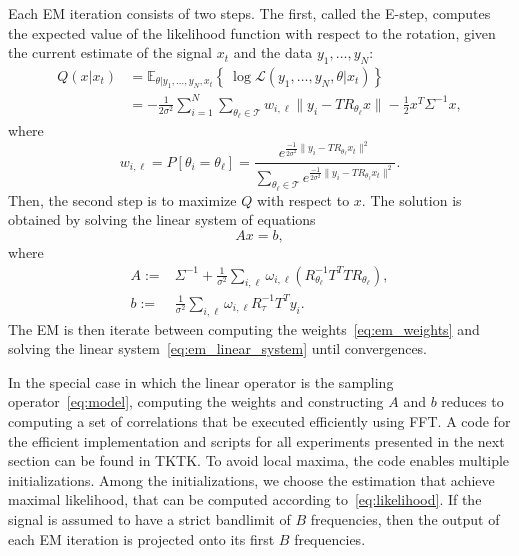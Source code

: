 \documentclass[english,12pt]{article}
\newcommand{\E}{\mathbb{E}}
\numberwithin{equation}{section}
\numberwithin{thm}{section} %
\begin{document}
Each EM iteration consists of two steps.
The first, called the E-step, computes the expected value of the likelihood function with respect to the rotation, given the current estimate of the signal $x_t$ and the data $y_1,\ldots,y_N$:
\begin{equation}
\begin{split}
Q(x|x_t) &= \E_{\theta|y_1,\ldots,y_N,x_t}\left\{\ \log \mathcal{L}(y_1,\ldots,y_N,\theta|x_t)  \right\} \\
& = -\frac{1}{2\sigma^2}\sum_{i=1}^{N}\sum_{\theta_\ell\in\mathcal{T}}w_{i,\ell}\|y_i - TR_{\theta_\ell}x\| - \frac{1}{2}x^T\Sigma^{-1}x,
\end{split}
\end{equation} 
where 
\begin{equation} \label{eq:em_weights}
w_{i,\ell} = P[\theta_i = \theta_\ell] = \frac{e^{\frac{-1}{2\sigma^2}\|y_i-TR_{\theta_\ell} x_t\|^2 }}{\sum_{{\theta_\ell}\in\mathcal{T}}e^{\frac{-1}{2\sigma^2}\|y_i-TR_{\theta_\ell} x_t\|^2 }}.
\end{equation}
Then,  the second step is to maximize $Q$ with respect to $x$. 
The solution is obtained by solving the linear system of equations
\begin{equation} \label{eq:em_linear_system}
Ax = b,
\end{equation}
where 
\begin{align}
A :=&  \Sigma^{-1} + \frac{1}{\sigma^2}\sum_{i,\ell}\omega_{i,\ell} (R_{\theta_\ell}^{-1}T^TTR_{\theta_\ell}),\\ 
b :=&   \frac{1}{\sigma^2} \sum_{i,\ell}\omega_{i,\ell}R_\tau^{-1}T^Ty_i.
\end{align}
The EM is then iterate between computing the weights~\eqref{eq:em_weights} and solving the linear system~\eqref{eq:em_linear_system} until convergences. 

In the special case in which the linear operator is the sampling operator~\eqref{eq:model}, computing the weights and constructing $A$ and $b$ reduces to computing a set of correlations that be executed  efficiently using FFT. 
A code for the efficient implementation and scripts for all experiments presented in the next section can be found in TKTK. To avoid local maxima, the code enables multiple initializations. Among the initializations, we choose the estimation that achieve  maximal likelihood, that can be computed according to~\eqref{eq:likelihood}. If the signal is assumed to have a strict bandlimit of $B$ frequencies, then the output of each EM iteration is projected onto its first $B$ frequencies.
\end{document}
